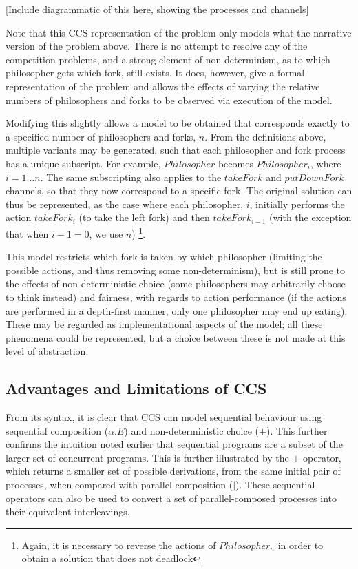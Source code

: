 [Include diagrammatic of this here, showing the processes and channels]

Note that this CCS representation of the problem only models what the
narrative version of the problem above.  There is no attempt to
resolve any of the competition problems, and a strong element of
non-determinism, as to which philosopher gets which fork, still
exists.  It does, however, give a formal representation of the problem
and allows the effects of varying the relative numbers of philosophers
and forks to be observed via execution of the model.

Modifying this slightly allows a model to be obtained that corresponds
exactly to a specified number of philosophers and forks, $n$.  From
the definitions above, multiple variants may be generated, such that
each philosopher and fork process has a unique subscript.  For
example, $Philosopher$ becomes $Philosopher_i$, where $i = 1\dots n$.
The same subscripting also applies to the $takeFork$ and $putDownFork$
channels, so that they now correspond to a specific fork.  The
original solution can thus be represented, as the case where each
philosopher, $i$, initially performs the action $takeFork_i$ (to take
the left fork) and then $takeFork_{i-1}$ (with the exception that when
$i-1 = 0$, we use $n$) \footnote{Again, it is necessary to reverse the
  actions of $Philosopher_n$ in order to obtain a solution that does not
  deadlock}.

This model restricts which fork is taken by which philosopher
(limiting the possible actions, and thus removing some
non-determinism), but is still prone to the effects of
non-deterministic choice (some philosophers may arbitrarily choose to
think instead) and fairness, with regards to action performance (if
the actions are performed in a depth-first manner, only one
philosopher may end up eating).  These may be regarded as
implementational aspects of the model; all these phenomena could be
represented, but a choice between these is not made at this level of
abstraction.

\subsection{Advantages and Limitations of CCS}
\label{ccslimit}

From its syntax, it is clear that CCS can model sequential behaviour
using sequential composition ($\alpha.E$) and non-deterministic choice
($+$).  This further confirms the intuition noted earlier that
sequential programs are a subset of the larger set of concurrent
programs.  This is further illustrated by the $+$ operator, which
returns a smaller set of possible derivations, from the same initial
pair of processes, when compared with parallel composition ($|$).
These sequential operators can also be used to convert a set of
parallel-composed processes into their equivalent interleavings.

